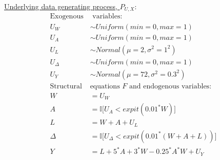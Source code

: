 \documentclass[answers]{exam}
\begin{document}
\underline{Underlying data generating process, $P_{U,X}$}:
\begin{align*}
\text{Exogenous} & \text{ variables:} \\
U_{W}& \sim Uniform(min=0, max=1) \\
U_{A} &\sim Uniform(min=0, max=1) \\
U_{L} &\sim Normal(\mu=2, \sigma^2=1^2)\\
U_{\Delta} &\sim Uniform(min=0, max=1) \\
U_{Y} &\sim Normal(\mu= 72, \sigma^2 =0.3^2)  \\
\text{Structural } & \text{equations $F$ and endogenous variables:}  \\
W& = U_W \\
A &  = \mathbb{I}\big[U_A < expit(0.01^*W) \big]\\
L &  = W + A + U_L\\
\Delta & = \mathbb{I} \big[U_{\Delta} < expit(0.01^*(W + A + L)) \big]\\
Y & = L + 5^*A + 3^*W - 0.25^*A^*W + U_Y 
\end{align*}
\end{document}
